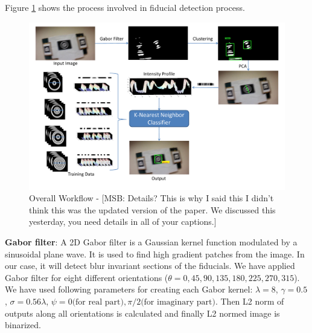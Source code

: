 \documentclass[runningheads]{llncs}
\begin{document}

Figure \ref{fig:overall_flow} shows the process involved in fiducial detection
process. 

\begin{figure}
\includegraphics[width=\linewidth]{overall_flow.pdf}
\caption{Overall Workflow - [MSB: Details?  This is why I said this I didn't think this
was the updated version of the paper. We discussed this yesterday, you need details in all of your captions.] }
\label{fig:overall_flow}
\end{figure}

\noindent\textbf{Gabor filter}: A 2D Gabor filter is a Gaussian kernel function
modulated by a sinusoidal plane wave. It is used to find high gradient patches from the
image. In our case, it will detect blur invariant sections of the fiducials. We
have applied Gabor filter for eight different orientations ($\theta = 0, 45,
90, 135, 180, 225, 270, 315$). We have used following parameters for
creating each Gabor kernel: $\lambda = 8$, $\gamma = 0.5$, $\sigma =
0.56\lambda$, $\psi = 0 \text{(for real part)}, \pi/2 \text{(for imaginary
part)}$.
Then L2 norm of outputs along all orientations is calculated and finally L2
normed image is binarized.
\end{document}
